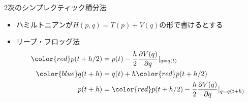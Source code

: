 \begin{frame}[t,fragile]{2次のシンプレクティック積分法}
  \begin{itemize}
  \item ハミルトニアンが$H(p,q) = T(p) + V(q)$の形で書けるとする
  \item リープ・フロッグ法
    \begin{align*}
      {\color{red} p(t+h/2)} &= p(t) - \frac{h}{2} \frac{\partial V(q)}{\partial q}|_{q=q(t)} \\
      {\color{blue} q(t+h)} &= q(t) + h {\color{red}p(t+h/2)} \\
      p(t+h) &= {\color{red}p(t+h/2}) - \frac{h}{2} \frac{\partial V(q)}{\partial q}|_{q=q(t+h)}
    \end{align*}
  \end{itemize}
\end{frame}
